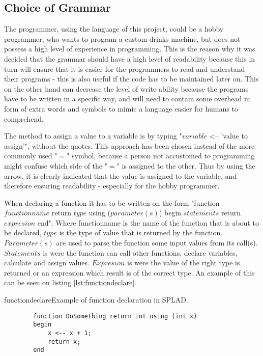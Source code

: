 \subsection{Choice of Grammar}
\label{sec:grammarchoice}
The programmer, using the language of this project, could be a hobby programmer, who wants to program a custom drinks machine, but does not possess a high level of experience in programming. This is the reason why it was decided that the grammar should have a high level of readability because this in turn will ensure that it is easier for the programmers to read and understand their programs - this is also useful if the code has to be maintained later on. This on the other hand can decrease the level of write-ability because the programs have to be written in a specific way, and will need to contain some overhead in form of extra words and symbols to mimic a language easier for humans to comprehend.

The method to assign a value to a variable is by typing "$variable$ <-- 'value to assign'", without the quotes. This approach has been chosen instead of the more commonly used "$=$" symbol, because a person not accustomed to programming might confuse which side of the "$=$" is assigned to the other. Thus by using the arrow, it is clearly indicated that the value is assigned to the variable, and therefore ensuring readability - especially for the hobby programmer.

When declaring a function it has to be written on the form "function $functionname$ return $type$ using ($parameter(s)$) begin $statements$ return $expresion$ end". Where functionname is the name of the function that is about to be declared, $type$ is the type of value that is returned by the function. $Parameter(s)$ are used to parse the function some input values from its call(s). $Statements$ is were the function can call other functions, declare variables, calculate and assign values. $Expresion$ is were the value of the right type is returned or an expression which result is of the correct type.
An example of this can be seen on listing \ref{lst:functiondeclare}.

\begin{code}{functiondeclare}{Example of function declaration in SPLAD.}
	\begin{lstlisting}
		function DoSomething return int using (int x)
		begin
			x <-- x + 1;
			return x;
		end
	\end{lstlisting}
\end{code}

